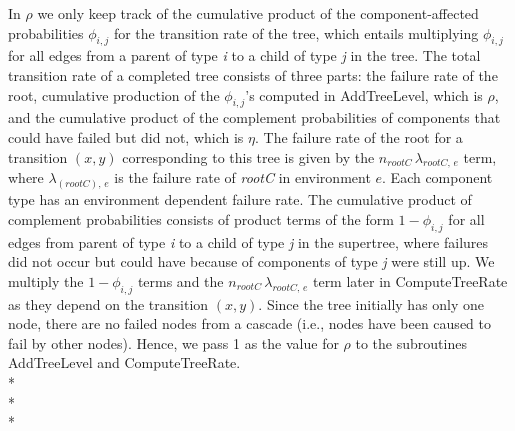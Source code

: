 \documentclass[12pt]{article}
\newcommand{\varName}[1]{\textrm{\it#1}}
\begin{document}
In $\rho$ we only keep track of the cumulative product of the component-affected probabilities $\phi_{i,j}$ for the transition rate of the tree, which entails multiplying $\phi_{i, j}$ for all edges from a parent of type \varName{i} to a child of type \varName{j} in the tree. The total transition rate of a completed tree consists of three parts: the failure rate of the root, cumulative production of the $\phi_{i,j}$'s computed in AddTreeLevel, which is $\rho$, and the cumulative product of the complement probabilities of components that could have failed but did not, which is $\eta$. The failure rate of the root for a transition $(x,y)$ corresponding to this tree is given by the $n_{rootC} \, \lambda_{rootC, \,e}$ term, where $\lambda_{(rootC), \,e}$ is the failure rate of \varName{rootC} in environment $e$. Each component type has an environment dependent failure rate. The cumulative product of complement probabilities consists of product terms of the form $1-\phi_{i, j}$ for all edges from parent of type \varName{i} to a child of type \varName{j} in the supertree, where failures did not occur but could have because of components of type \varName{j} were still up. We multiply the $1-\phi_{i,j}$ terms and the $n_{rootC} \, \lambda_{rootC, \,e}$ term later in ComputeTreeRate as they depend on the transition $(x,y)$. Since the tree initially has only one node, there are no failed nodes from a cascade (i.e., nodes have been caused to fail by other nodes). Hence, we pass 1 as the value for $\rho$ to the subroutines AddTreeLevel and ComputeTreeRate.
\\*\\*\\*
\end{document}
